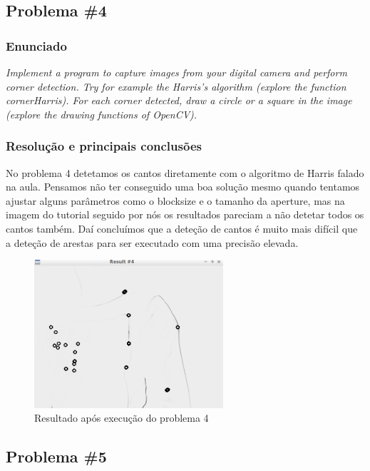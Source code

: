 \documentclass[portuguese, times, mirror]{revdetua}
\begin{document}
\newpage
\subsection{Problema \#4}

\subsubsection{Enunciado}
\textit{Implement a program to capture images from your digital camera and perform corner detection.
Try for example the Harris’s algorithm (explore the function cornerHarris). For each corner
detected, draw a circle or a square in the image (explore the drawing functions of OpenCV).}

\subsubsection{Resolução e principais conclusões}

No problema 4 detetamos os cantos diretamente com o algoritmo de Harris falado na aula. Pensamos não ter conseguido uma boa solução mesmo quando tentamos ajustar alguns parâmetros como o blocksize e o tamanho da aperture, mas na imagem do tutorial seguido por nós os resultados pareciam a não detetar todos os cantos também. Daí concluímos que a deteção de cantos é muito mais difícil que a deteção de arestas para ser executado com uma precisão elevada.

\begin{figure}[ht!]
\centering
\includegraphics[width=70mm]{img/ex4.png}
\caption{Resultado após execução do problema 4}
\end{figure}

\newpage

\subsection{Problema \#5}
\end{document}
